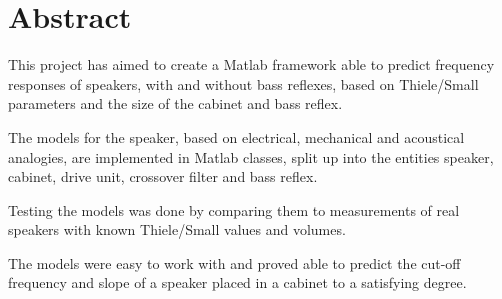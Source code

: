 
\chapter{Abstract}
\label{sec:Abstract}

This project has aimed to create a Matlab framework able to predict frequency responses of speakers, with and without bass reflexes, based on Thiele/Small parameters and the size of the cabinet and bass reflex.

The models for the speaker, based on electrical, mechanical and acoustical analogies, are implemented in Matlab classes, split up into the entities speaker, cabinet, drive unit, crossover filter and bass reflex.

Testing the models was done by comparing them to measurements of real speakers with known Thiele/Small values and volumes.

The models were easy to work with and proved able to predict the cut-off frequency and slope of a speaker placed in a cabinet to a satisfying degree.